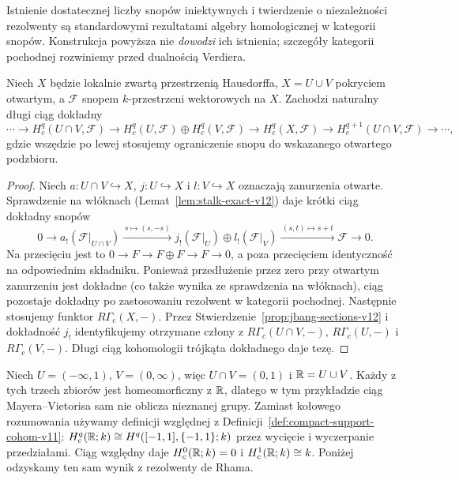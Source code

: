 \begin{uwaga}
Istnienie dostatecznej liczby snopów iniektywnych i twierdzenie
o niezależności rezolwenty są standardowymi rezultatami
algebry homologicznej w kategorii snopów. Konstrukcja powyższa
nie \emph{dowodzi} ich istnienia; szczegóły kategorii
pochodnej rozwiniemy przed dualnością Verdiera.
\end{uwaga}

\begin{lemat}
\label{lem:sheaf-mv-v12}
Niech $X$ będzie lokalnie zwartą przestrzenią Hausdorffa,
$X=U\cup V$ pokryciem otwartym, a $\mathcal F$ snopem
$k$-przestrzeni wektorowych na $X$. Zachodzi naturalny
długi ciąg dokładny
\[
\cdots\longrightarrow H_c^q(U\cap V,\mathcal F)
\longrightarrow H_c^q(U,\mathcal F)\oplus H_c^q(V,\mathcal F)
\longrightarrow H_c^q(X,\mathcal F)
\longrightarrow H_c^{q+1}(U\cap V,\mathcal F)\longrightarrow\cdots,
\]
gdzie wszędzie po lewej stosujemy ograniczenie snopu do
wskazanego otwartego podzbioru.
\end{lemat}
\begin{proof}
Niech $a:U\cap V\hookrightarrow X$, $j:U\hookrightarrow X$
i $l:V\hookrightarrow X$ oznaczają zanurzenia otwarte.
Sprawdzenie na włóknach (Lemat~\ref{lem:stalk-exact-v12}) daje krótki
ciąg dokładny snopów
\[
0\longrightarrow a_!(\mathcal F|_{U\cap V})
\xrightarrow{\,s\mapsto(s,-s)\,}
 j_!(\mathcal F|_U)\oplus l_!(\mathcal F|_V)
\xrightarrow{\,(s,t)\mapsto s+t\,}\mathcal F\longrightarrow0.
\]
Na przecięciu jest to $0\to F\to F\oplus F\to F\to0$,
a poza przecięciem identyczność na odpowiednim składniku.
Ponieważ przedłużenie przez zero przy otwartym zanurzeniu
jest dokładne (co także wynika ze sprawdzenia na włóknach),
ciąg pozostaje dokładny po zastosowaniu rezolwent w kategorii
pochodnej. Następnie stosujemy funktor $R\Gamma_c(X,-)$.
Przez Stwierdzenie~\ref{prop:jbang-sections-v12} i dokładność
$j_!$ identyfikujemy otrzymane człony z
$R\Gamma_c(U\cap V,-)$, $R\Gamma_c(U,-)$ i $R\Gamma_c(V,-)$.
Długi ciąg kohomologii trójkąta dokładnego daje tezę.
\end{proof}

\begin{przyklad}[Obliczenie $H_c^*(\R;k)$]
Niech $U=(-\infty,1)$, $V=(0,\infty)$, więc $U\cap V=(0,1)$
i $\mathbb{R}=U\cup V$. Każdy z tych trzech zbiorów jest homeomorficzny
z $\mathbb{R}$, dlatego w tym przykładzie ciąg Mayera--Vietorisa
sam nie oblicza nieznanej grupy. Zamiast kołowego rozumowania
używamy definicji względnej z
Definicji~\ref{def:compact-support-cohom-v11}:
$H_c^q(\mathbb{R};k)\cong H^q([-1,1],\{-1,1\};k)$
przez wycięcie i wyczerpanie przedziałami. Ciąg względny daje
$H_c^0(\mathbb{R};k)=0$ i $H_c^1(\mathbb{R};k)\cong k$.
Poniżej odzyskamy ten sam wynik z rezolwenty de Rhama.
\end{przyklad}

